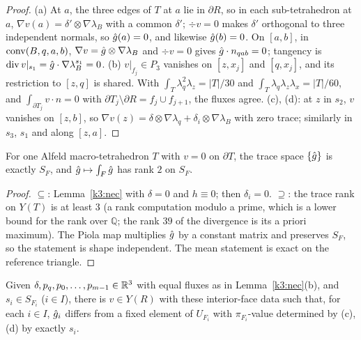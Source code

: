 \begin{proof}
(a) At $a$, the three edges of $T$ at $a$ lie in $\partial R$, so in each sub-tetrahedron at $a$, $\nabla v(a)=\delta'\otimes\nabla\lambda_B$ with a common $\delta'$; $\div v=0$ makes $\delta'$ orthogonal to three independent normals, so $\hat g(a)=0$, and likewise $\hat g(b)=0$. On $[a,b]$, in $\operatorname{conv}(B,q,a,b)$, $\nabla v=\hat g\otimes\nabla\lambda_B$ and $\div v=0$ gives $\hat g\cdot n_{qab}=0$; tangency is $\operatorname{div} v|_{s_1}=\hat g\cdot\nabla\lambda_B^{s_1}=0$. (b) $v|_{f_j}\in P_3$ vanishes on $[z,x_j]$ and $[q,x_j]$, and its restriction to $[z,q]$ is shared. With $\int_T\lambda_q^2\lambda_z=|T|/30$ and $\int_T\lambda_q\lambda_z\lambda_x=|T|/60$, and $\int_{\partial T_j}v\cdot n=0$ with $\partial T_j\setminus\partial R=f_j\cup f_{j+1}$, the fluxes agree. (c), (d): at $z$ in $s_2$, $v$ vanishes on $[z,b]$, so $\nabla v(z)=\delta\otimes\nabla\lambda_q+\delta_i\otimes\nabla\lambda_B$ with zero trace; similarly in $s_3$, $s_1$ and along $[z,a]$.
\end{proof}

\begin{lemma}\label{k3:single}
For one Alfeld macro-tetrahedron $T$ with $v=0$ on $\partial T$, the trace space $\{\hat g\}$ is exactly $S_F$, and $\hat g\mapsto\int_F\hat g$ has rank $2$ on $S_F$. 
\end{lemma}

\begin{proof}
$\subseteq$: Lemma~\ref{k3:nec} with $\delta=0$ and $h\equiv0$; then $\delta_i=0$. $\supseteq$: the trace rank on $Y(T)$ is at least $3$ (a rank computation modulo a prime, which is a lower bound for the rank over $\mathbb Q$; the rank $39$ of the divergence is its a priori maximum). The Piola map multiplies $\hat g$ by a constant matrix and preserves $S_F$, so the statement is shape independent. The mean statement is exact on the reference triangle.
\end{proof}

\begin{lemma}[Realisability]\label{k3:suff}
Given $\delta,p_q,p_0,\dots,p_{m-1}\in\mathbb R^3$ with equal fluxes as in Lemma~\ref{k3:nec}(b), and $s_i\in S_{F_i}$ ($i\in I$), there is $v\in Y(R)$ with these interior-face data such that, for each $i\in I$, $\hat g_i$ differs from a fixed element of $U_{F_i}$ with $\pi_{F_i}$-value determined by (c), (d) by exactly $s_i$.
\end{lemma}


